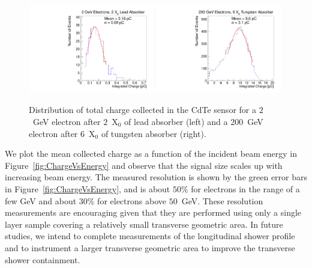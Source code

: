 \documentclass[preprint,1p]{elsarticle}
\begin{document}
\begin{figure}[htbp] 
\centering
\includegraphics[width=0.49\textwidth]{figures/2GeV_charge.pdf} 
\includegraphics[width=0.49\textwidth]{figures/200GeV_charge.pdf} 
\caption{Distribution of total charge collected in the CdTe sensor for a $2$~GeV
electron after $2$~$\mathrm{X}_{0}$ of lead absorber (left) and a 200~GeV
electron after $6$~$\mathrm{X}_{0}$ of tungsten absorber (right). } 
\label{fig:ChargeDistribution} 
\end{figure} 

We plot the mean collected charge as a function of the incident beam energy
in Figure~\ref{fig:ChargeVsEnergy} and observe that the signal size scales
up with increasing beam energy. The measured resolution is shown by the green
error bars in Figure~\ref{fig:ChargeVsEnergy}, and is about $50\%$ for electrons
in the range of a few GeV and about $30\%$ for electrons above $50$~GeV. 
These resolution measurements are encouraging given that they are performed
using only a single layer sample covering a relatively small transverse
geometric area. In future studies, we intend to complete measurements of the
longitudinal shower profile and to instrument a larger transverse geometric
area to improve the transverse shower containment. 
\end{document}
